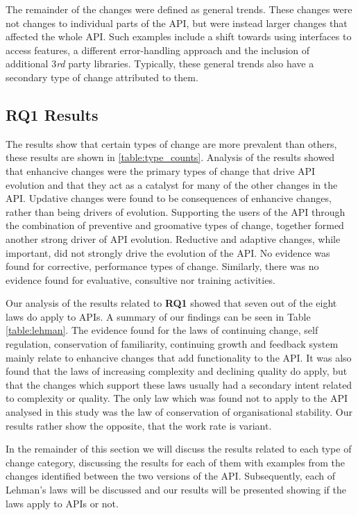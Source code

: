 \documentclass{sig-alternate}
\begin{document}
The remainder of the changes were defined as general trends. These changes were not changes to individual parts of the API, but were instead larger changes that affected the whole API. Such examples include a shift towards using interfaces to access features, a different error-handling approach and the inclusion of additional 3\textit{rd} party libraries. Typically, these general trends also have a secondary type of change attributed to them.



\subsection{RQ1 Results} \label{results_rq1}

The results show that certain types of change are more prevalent than others, these results are shown in \ref{table:type_counts}. Analysis of the results showed that enhancive changes were the primary types of change that drive API evolution and that they act as a catalyst for many of the other changes in the API. Updative changes were found to be consequences of enhancive changes, rather than being drivers of evolution. Supporting the users of the API through the combination of preventive and groomative types of change, together formed another strong driver of API evolution. Reductive and adaptive changes, while important, did not strongly drive the evolution of the API. No evidence was found for corrective, performance types of change. Similarly, there was no evidence found for evaluative, consultive nor training activities.    

Our analysis of the results related to \textbf{RQ1} showed that seven out of the eight laws \cite{lehman90sview} do apply to APIs. A summary of our findings can be seen in Table \ref{table:lehman}. The evidence found for the laws of continuing change, self regulation, conservation of familiarity, continuing growth and feedback system mainly relate to enhancive changes that add functionality to the API. It was also found that the laws of increasing complexity and declining quality do apply, but that the changes which support these laws usually had a secondary intent related to complexity or quality. The only law which was found not to apply to the API analysed in this study was the law of conservation of organisational stability. Our results rather show the opposite, that the work rate is variant. 

In the remainder of this section we will discuss the results related to each type of change category, discussing the results for each of them with examples from the changes identified between the two versions of the API. Subsequently, each of Lehman's laws will be discussed and our results will be presented showing if the laws apply to APIs or not.
\end{document}
